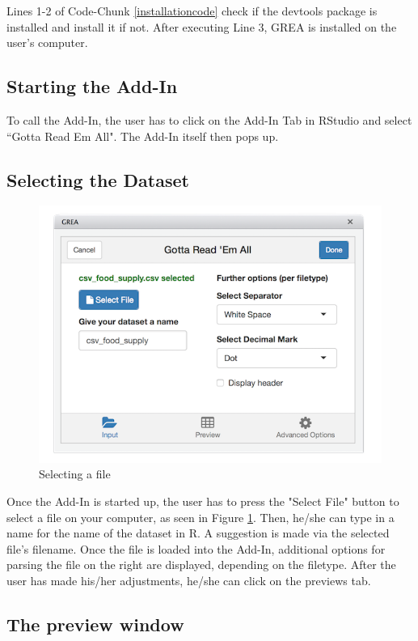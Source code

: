 \documentclass[12pt]{article} %
\begin{document}
Lines 1-2 of Code-Chunk \ref{installationcode} check if the devtools package is installed and install it if not. After executing Line 3, GREA is installed on the user's computer.

\subsection{Starting the Add-In}

To call the Add-In, the user has to click on the Add-In Tab in RStudio and select ``Gotta Read Em All". The Add-In itself then pops up.

\subsection{Selecting the Dataset}

\begin{figure}
\center
\includegraphics[scale = 0.7]{figures/step1.png}
\caption{Selecting a file}
\label{stepone}
\end{figure}

Once the Add-In is started up, the user has to press the "Select File" button to select a file on your computer, as seen in Figure \ref{stepone}. Then, he/she can type in a name for the name of the dataset in R. A suggestion is made via the selected file's filename. Once the file is loaded into the Add-In, additional options for parsing the file on the right are displayed, depending on the filetype. After the user has made his/her adjustments, he/she can click on the previews tab.

\subsection{The preview window}
\end{document}
